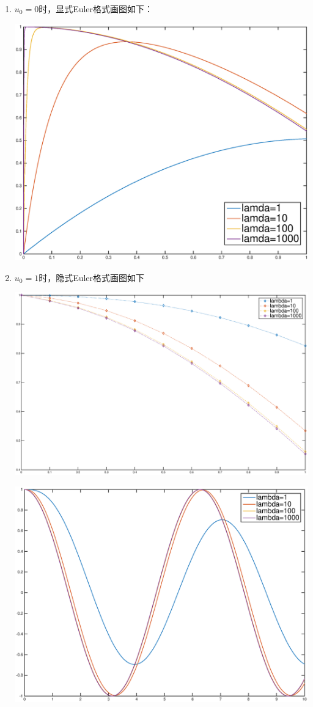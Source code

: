 \documentclass{ctexart}
\begin{document}
\begin{enumerate}
\begin{enumerate}
\begin{enumerate}
\item \(u_0=0\)时，显式Euler格式画图如下：

\centerline{\includegraphics[width=5.5in]{Y0.eps}}

\item \(u_0=1\)时，隐式Euler格式画图如下

\centerline{\includegraphics[width=5.5in]{2_4.eps}}
\centerline{\includegraphics[width=5.5in]{2_3.eps}}
\end{enumerate}



\end{enumerate}
\end{enumerate}
\end{document}
